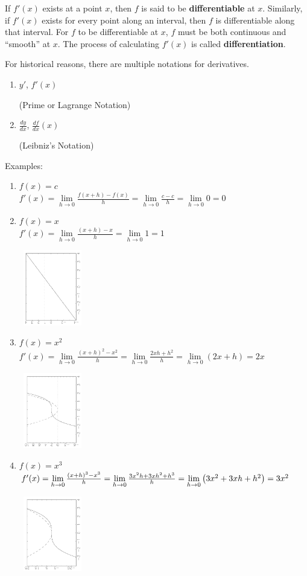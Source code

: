 \documentclass[20pt]{extarticle}
\newcommand{\be}{\begin{enumerate}}
\newcommand{\ee}{\end{enumerate}}
\newcommand{\llim}{\lim\limits}
\newcommand{\pb}{\parbox{1in}}
\newcommand{\pbt}{\parbox[t]{2in}}
\newcommand{\pbff}{\parbox[t]{4in}}
\begin{document}
\item If $f'(x)$ exists at a point $x$, then $f$ is said to be {\bf
differentiable} at $x$.  Similarly, if $f'(x)$ exists for every point
along an interval, then $f$ is differentiable along that interval.  For
$f$ to be differentiable at $x$, $f$ must be both continuous and
``smooth'' at $x$.  The process of calculating $f'(x)$ is called {\bf
differentiation}.

\item For historical reasons, there are multiple notations for
  derivatives.  
  \be
  \item \pbt{$y'$, $f'(x)$} (Prime or Lagrange Notation)
    \item \pbt{$\frac{dy}{dx}$, $\frac{df}{dx}(x)$} (Leibniz's Notation)
  \ee

\item Examples:
  \be
  \item $f(x)=c$\\
   $f'(x)=\llim_{h\to 0} \frac{f(x+h)-f(x)}{h}
   =\llim_{h\to 0} \frac{c-c}{h}
   =\llim_{h\to 0} 0 = 0$
  \item \pbff{$f(x)=x$\\
   $f'(x)=\llim_{h\to 0} \frac{(x+h)-x}{h}
   =\llim_{h\to 0} 1 = 1$}
   \pb{\,  {\includegraphics[width=1in, angle = 270]{derivxJ}}}
  \item \pbff{$f(x)=x^2$\\
   $f'(x)=\llim_{h\to 0} \frac{(x+h)^2-x^2}{h}
   =\llim_{h\to 0}\frac{2xh+h^2}{h}
   =\llim_{h\to 0} (2x + h) = 2x$}
   \pb{\,  {\includegraphics[width=1in, angle = 270]{derivx2J}}}
  \item \pbff{$f(x)=x^3$\\
   $f'(x) = \llim_{h\to 0}\frac{(x+h)^3-x^3}{h}
   = \llim_{h\to 0}\frac{3x^2 h +3xh^2 + h^3}{h}\\
   = \llim_{h\to 0}\left(3x^2 + 3xh+h^2\right)
   = 3x^2$}
   \pb{\,  {\includegraphics[width=1in, angle = 270]{derivx3J}}}
  \ee
\end{document}
